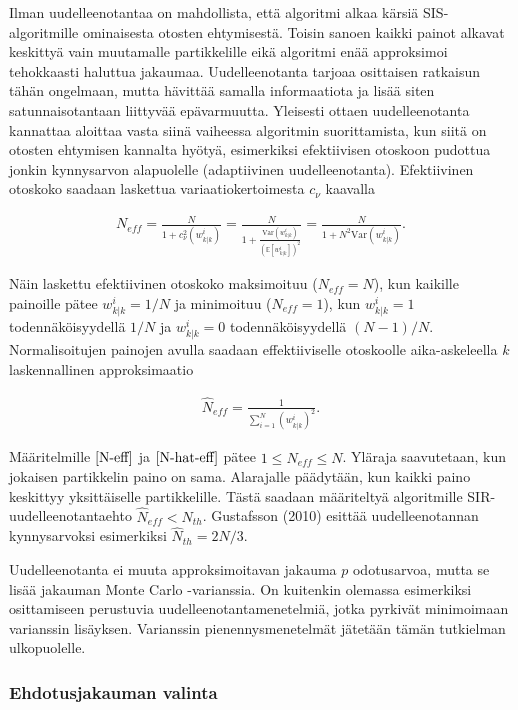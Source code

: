 \documentclass[
  12pt,
  a4paper, twoside]{book}
\begin{document}
Ilman uudelleenotantaa on mahdollista, että algoritmi alkaa kärsiä SIS-algoritmille ominaisesta otosten ehtymisestä. Toisin sanoen kaikki painot alkavat keskittyä vain muutamalle partikkelille eikä algoritmi enää approksimoi tehokkaasti haluttua jakaumaa. Uudelleenotanta tarjoaa osittaisen ratkaisun tähän ongelmaan, mutta hävittää samalla informaatiota ja lisää siten satunnaisotantaan liittyvää epävarmuutta. Yleisesti ottaen uudelleenotanta kannattaa aloittaa vasta siinä vaiheessa algoritmin suorittamista, kun siitä on otosten ehtymisen kannalta hyötyä, esimerkiksi efektiivisen otoskoon pudottua jonkin kynnysarvon alapuolelle (adaptiivinen uudelleenotanta). Efektiivinen otoskoko saadaan laskettua variaatiokertoimesta \(c_\nu\) kaavalla

\begin{align}\label{N-eff}
N_{eff}= \frac{N}{1+c_\nu^2(w^i_{k|k})} = \frac{N}{1+\frac{\text{Var}(w^i_{k|k})}{(\mathbb{E}[w^i_{k|k}])^2}} =\frac{N}{1+N^2\text{Var}(w^i_{k|k})}.
\end{align}

Näin laskettu efektiivinen otoskoko maksimoituu (\(N_{eff}=N\)), kun kaikille painoille pätee \(w^i_{k|k}=1/N\) ja minimoituu (\(N_{eff}=1\)), kun \(w^i_{k|k}=1\) todennäköisyydellä \(1/N\) ja \(w^i_{k|k}=0\) todennäköisyydellä \((N-1)/N\). Normalisoitujen painojen avulla saadaan effektiiviselle otoskoolle aika-askeleella \(k\) laskennallinen approksimaatio

\begin{align}\label{N-hat-eff}
\hat{N}_{eff}=\frac{1}{\sum_{i=1}^N(w^i_{k|k})^2}.
\end{align}

Määritelmille \(\ref{N-eff}\) ja \(\ref{N-hat-eff}\) pätee \(1 \leq \hat{N}_{eff} \leq N\). Yläraja saavutetaan, kun jokaisen partikkelin paino on sama. Alarajalle päädytään, kun kaikki paino keskittyy yksittäiselle partikkelille. Tästä saadaan määriteltyä algoritmille SIR-uudelleenotantaehto \(\hat{N}_{eff}< N_{th}\). Gustafsson (2010) \citep{gustafsson-2010} esittää uudelleenotannan kynnysarvoksi esimerkiksi \(\hat{N}_{th}=2N/3\).

Uudelleenotanta ei muuta approksimoitavan jakauma \(p\) odotusarvoa, mutta se lisää jakauman Monte Carlo -varianssia. On kuitenkin olemassa esimerkiksi osittamiseen perustuvia uudelleenotantamenetelmiä, jotka pyrkivät minimoimaan varianssin lisäyksen. Varianssin pienennysmenetelmät jätetään tämän tutkielman ulkopuolelle.

\subsubsection{Ehdotusjakauman valinta}
\end{document}
